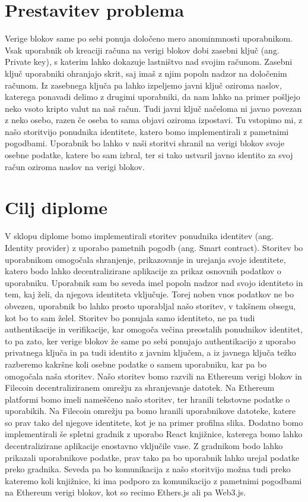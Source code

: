 \documentclass[a4paper,12pt,openright]{book}
\begin{document}
\section{Prestavitev problema}
Verige blokov same po sebi ponuja določeno mero anominmnosti uporabnikom.
Vsak uporabnik ob kreaciji računa na verigi blokov dobi zasebni ključ (ang. Private key), s katerim lahko dokazuje lastništvo nad svojim računom.
Zasebni ključ uporabniki ohranjajo skrit, saj imaš z njim popoln nadzor na določenim računom.
Iz zasebnega ključa pa lahko izpeljemo javni ključ oziroma naslov, katerega ponavadi delimo z drugimi uporabniki, 
da nam lahko na primer pošljejo neko vsoto kripto valut na naš račun.
Tudi javni ključ načeloma ni javno povezan z neko osebo, razen če oseba to sama objavi oziroma izpostavi.
Tu vstopimo mi, z našo storitvijo ponudnika identitete, katero bomo implementirali z pametnimi pogodbami.
Uporabnik bo lahko v naši storitvi shranil na verigi blokov svoje osebne podatke, katere bo sam izbral, 
ter si tako ustvaril javno identito za svoj račun oziroma naslov na verigi blokov.

\section{Cilj diplome}
V sklopu diplome bomo implementirali storitev ponudnika identitev (ang. Identity provider) z uporabo pametnih pogodb (ang. Smart contract).
Storitev bo uporabnikom omogočala shranjenje, prikazovanje in urejanja svoje identitete, katero bodo lahko decentralizirane aplikacije za prikaz osnovnih podatkov o uporabniku.
Uporabnik sam bo seveda imel popoln nadzor nad svojo identiteto in tem, kaj želi, da njegova identiteta vključuje.
Torej noben vnos podatkov ne bo obvezen, uporabnik bo lahko prosto uporabljal našo storitev, v takšnem obsegu, kot bo to sam želel.
Storitev bo ponujala samo identiteto, ne pa tudi authentikacije in verifikacije, kar omogoča večina preostalih ponudnikov identitet, to pa zato, 
ker verige blokov že same po sebi ponujajo authentikacijo z uporabo privatnega ključa in pa tudi identito z javnim ključem, 
a iz javnega ključa težko razberemo kakršne koli osebne podatke o samem uporabniku, kar pa bo omogočala naša storitev.
Našo storitev bomo razvili na Ethereum verigi blokov in Filecoin decentraliziranem omrežju za shranjevanje datotek.
Na Ethereum platformi bomo imeli nameščeno našo storitev, ter hranili tekstovne podatke o uporabikih.
Na Filecoin omrežju pa bomo hranili uporabnikove datoteke, katere so prav tako del njegove identitete, kot je na primer profilna slika.
Dodatno bomo implementirali še spletni gradnik z uporabo React knjižnice, katerega bomo lahko decentralizirane aplikacije enostavno vključile vase.
Z gradnikom bodo lahko prikazali uporabnikove podatke, prav tako pa bo uporabnik lahko urejal podatke preko gradnika.
Seveda pa bo komunikacija z našo storitvijo možna tudi preko kateremo koli knjižnice, ki ima podporo za komunikacijo z pametnimi pogodbami na Ethereum verigi blokov, kot so recimo Ethers.js ali pa Web3.js.
\end{document}
